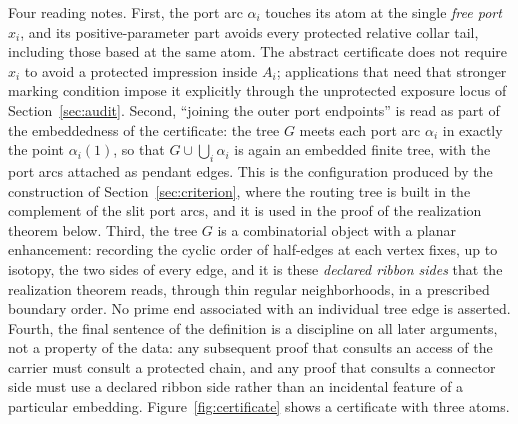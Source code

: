 \documentclass[11pt,reqno]{amsart}
\theoremstyle{definition}
\theoremstyle{remark}
\begin{document}
Four reading notes.  First, the port arc $\alpha_i$ touches its atom at
the single \emph{free port} $x_i$, and its positive-parameter part avoids
every protected relative collar tail, including those based at the same
atom.  The abstract certificate does not require $x_i$ to avoid a protected
impression inside $A_i$; applications that need that stronger marking
condition impose it explicitly through the unprotected exposure locus of
Section~\ref{sec:audit}.  Second, ``joining the outer port
endpoints'' is read as part of the embeddedness of the certificate: the
tree $G$ meets each port arc $\alpha_i$ in exactly the point
$\alpha_i(1)$, so that $G\cup\bigcup_i\alpha_i$ is again an embedded
finite tree, with the port arcs attached as pendant edges.  This is the
configuration produced by the construction of
Section~\ref{sec:criterion}, where the routing tree is built in the
complement of the slit port arcs, and it is used in the proof of the
realization theorem below.  Third, the tree $G$ is a
combinatorial object with a planar enhancement: recording the cyclic order
of half-edges at each vertex fixes, up to isotopy, the two sides of every
edge, and it is these \emph{declared ribbon sides} that the realization
theorem reads, through thin regular neighborhoods, in a prescribed
boundary order.  No prime end associated with an individual tree edge is
asserted.
Fourth, the final sentence of the definition is a discipline on all later
arguments, not a property of the data: any subsequent proof that consults
an access of the carrier must consult a protected chain, and any proof that
consults a connector side must use a declared ribbon side rather than an
incidental feature of a particular embedding.  Figure~\ref{fig:certificate} shows a
certificate with three atoms.
\end{document}
